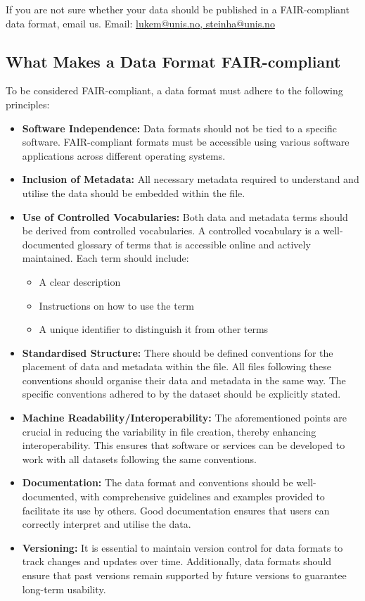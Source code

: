 \documentclass[a4paper,12pt]{article}
\makeatletter
\newcommand{\emailauthors}{\href{mailto:lukem@unis.no,steinha@unis.no}{lukem@unis.no, steinha@unis.no}}
\makeatother
\begin{document}
If you are not sure whether your data should be published in a FAIR-compliant data format, email us.
Email: \emailauthors  \\

\subsection{What Makes a Data Format FAIR-compliant}

To be considered FAIR-compliant, a data format must adhere to the following principles:

\begin{itemize}
\item \textbf{Software Independence:} Data formats should not be tied to a specific software. FAIR-compliant formats must be accessible using various software applications across different operating systems.
\item \textbf{Inclusion of Metadata:} All necessary metadata required to understand and utilise the data should be embedded within the file.
\item \textbf{Use of Controlled Vocabularies:} Both data and metadata terms should be derived from controlled vocabularies. A controlled vocabulary is a well-documented glossary of terms that is accessible online and actively maintained. Each term should include:
\begin{itemize}
\item A clear description
\item Instructions on how to use the term
\item A unique identifier to distinguish it from other terms
\end{itemize}
\item \textbf{Standardised Structure:} There should be defined conventions for the placement of data and metadata within the file. All files following these conventions should organise their data and metadata in the same way. The specific conventions adhered to by the dataset should be explicitly stated.
\item \textbf{Machine Readability/Interoperability:} The aforementioned points are crucial in reducing the variability in file creation, thereby enhancing interoperability. This ensures that software or services can be developed to work with all datasets following the same conventions.
\item \textbf{Documentation:} The data format and conventions should be well-documented, with comprehensive guidelines and examples provided to facilitate its use by others. Good documentation ensures that users can correctly interpret and utilise the data.
\item \textbf{Versioning:} It is essential to maintain version control for data formats to track changes and updates over time. Additionally, data formats should ensure that past versions remain supported by future versions to guarantee long-term usability.
\end{itemize}
\end{document}
